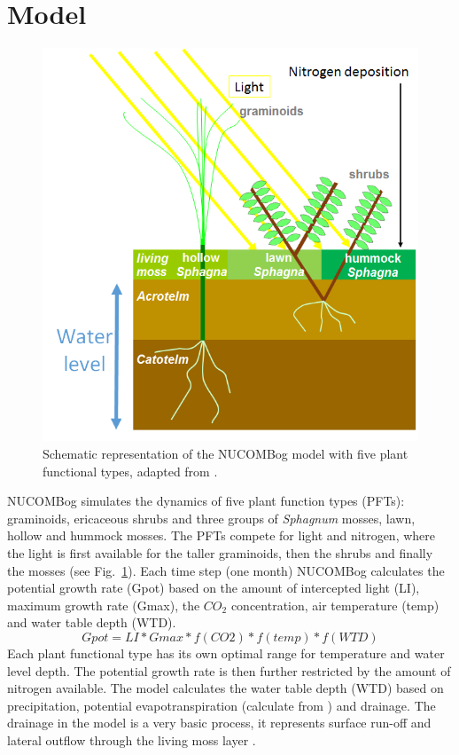\documentclass{article}\usepackage[]{graphicx}\usepackage[]{color}
\begin{document}
\section{Model}
\begin{figure}[htb]
\centering
\includegraphics[width=10 cm]{figure1}
\caption{Schematic representation of the NUCOMBog model with five plant functional types, adapted from \citet{Heijmans2008a}.}
\label{figure: model}
\end{figure}
NUCOMBog simulates the dynamics of five plant function types (PFTs): graminoids, ericaceous shrubs and three groups of \emph{Sphagnum} mosses, lawn, hollow and hummock mosses. The PFTs compete for light and nitrogen, where the light is first available for the taller graminoids, then the shrubs and finally the mosses (see Fig.~\ref{figure: model}). Each time step (one month) NUCOMBog calculates the potential growth rate (Gpot) based on the amount of intercepted light (LI), maximum growth rate (Gmax), the ${CO_2}$ concentration, air temperature (temp) and water table depth (WTD). 
\begin{equation} \label{eq1}
Gpot = LI * Gmax * f(CO2) * f(temp) * f(WTD)
\end{equation}
Each plant functional type has its own optimal range for temperature and water level depth. The potential growth rate is then further restricted by the amount of nitrogen available. The model calculates the water table depth (WTD) based on precipitation, potential evapotranspiration (calculate from \cite{Penman1946}) and drainage. The drainage in the model is a very basic process, it represents surface run-off and lateral outflow through the living moss layer \citep{Heijmans2008a}.
\end{document}
